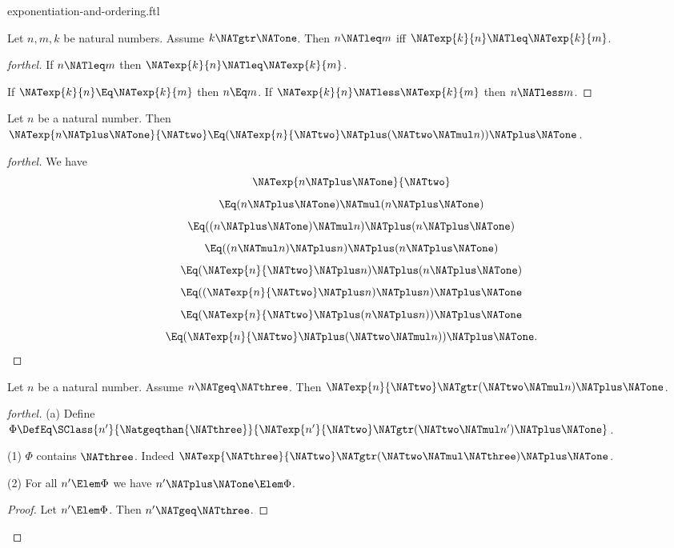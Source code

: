 \documentclass{stex}
\begin{document}
\begin{smodule}{exponentiation-and-ordering.ftl}
\begin{corollary}[forthel]
  Let $n, m, k$ be natural numbers.
  Assume $k \NATgtr \NATone$.
  Then $n \NATleq m$ iff $\NATexp{k}{n} \NATleq \NATexp{k}{m}$.
\end{corollary}
\begin{proof}[forthel]
  If $n \NATleq m$ then $\NATexp{k}{n} \NATleq \NATexp{k}{m}$.

  If $\NATexp{k}{n} \Eq \NATexp{k}{m}$ then $n \Eq m$.
  If $\NATexp{k}{n} \NATless \NATexp{k}{m}$ then $n \NATless m$.
\end{proof}

\begin{proposition}[forthel]
  Let $n$ be a natural number.
  Then $\NATexp{n \NATplus \NATone}{\NATtwo} \Eq (\NATexp{n}{\NATtwo} \NATplus (\NATtwo \NATmul n)) \NATplus \NATone$.
\end{proposition}
\begin{proof}[forthel]
  We have
  \[  \NATexp{n \NATplus \NATone}{\NATtwo}                       \]
  \[    \Eq (n \NATplus \NATone) \NATmul (n \NATplus \NATone)         \]
  \[    \Eq ((n \NATplus \NATone) \NATmul n) \NATplus (n \NATplus \NATone)   \]
  \[    \Eq ((n \NATmul n) \NATplus n) \NATplus (n \NATplus \NATone)   \]
  \[    \Eq (\NATexp{n}{\NATtwo} \NATplus n) \NATplus (n \NATplus \NATone)         \]
  \[    \Eq ((\NATexp{n}{\NATtwo} \NATplus n) \NATplus n) \NATplus \NATone         \]
  \[    \Eq (\NATexp{n}{\NATtwo} \NATplus (n \NATplus n)) \NATplus \NATone         \]
  \[    \Eq (\NATexp{n}{\NATtwo} \NATplus (\NATtwo \NATmul n)) \NATplus \NATone.    \]
\end{proof}

\begin{proposition}[forthel]
  Let $n$ be a natural number.
  Assume $n \NATgeq \NATthree$.
  Then $\NATexp{n}{\NATtwo} \NATgtr (\NATtwo \NATmul n) \NATplus \NATone$.
\end{proposition}
\begin{proof}[forthel]
  (a) Define $\Phi \DefEq \SClass{n'}{\Natgeqthan{\NATthree}}{\NATexp{n'}{\NATtwo} \NATgtr (\NATtwo \NATmul n') \NATplus \NATone}$.

  (1) $\Phi$ contains $\NATthree$.
  Indeed $\NATexp{\NATthree}{\NATtwo} \NATgtr (\NATtwo \NATmul \NATthree) \NATplus \NATone$.

  (2) For all $n' \Elem \Phi$ we have $n' \NATplus \NATone \Elem \Phi$.
  \begin{proof}
    Let $n' \Elem \Phi$.
    Then $n' \NATgeq \NATthree$.


\end{proof}
\end{proof}
\end{smodule}
\end{document}
